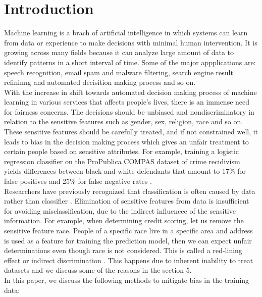 \documentclass[runningheads]{llncs}
\begin{document}
\section{Introduction}
Machine learning is a brach of artificial intelligence in which systems can learn from data or experience to make decisions with minimal human intervention. It is growing across many fields because it can analyze large amount of data to identify patterns in a short interval of time. Some of the major appplications are: speech recognition, email spam and malware filtering, search engine result refininng and automated decisition making process and so on.\\
With the increase in shift towards automated decision making process of machine learning in various services that affects people's lives, there is an immense need for fairness concerns. The decisions should be unbiased and nondiscriminatory in relation to the sensitive features such as gender, sex, religion, race and so on. These sensitive features should be carefully treated, and if not constrained well, it leads to bias in the decision making process which gives an unfair treatment to certain people based on sensitive attributes. For example, training a logistic regression classifier on the ProPublica COMPAS dataset of crime recidivism \cite{compasdataset} yields differences between black and white defendants that amount to 17\% for false positives and 25\% for false negative rates \cite{krasanakis2018adaptive}.\\
Researchers have previously recognized that classification is often caused by data rather than classifier \cite{feldman2015certifying} \cite{kleinberg2016inherent}. Elimination of sensitive features from data is insufficient for avoiding misclassification, due to the indirect influencec of the sensitive information. For example, when determining credit scoring, let us remove the sensitive feature race. People of a specific race live in a specific area and address is used as a feature for training the prediction model, then we can expect unfair determinations even though race is not considered. This is called a red-lining effect \cite{calders2010three} or indirect discrimination \cite{pedreshi2008discrimination}. This happens due to inherent inability to treat datasets and we discuss some of the reasons in the section 5.\\
In this paper, we discuss the following methods to mitigate bias in the training data:
\end{document}
